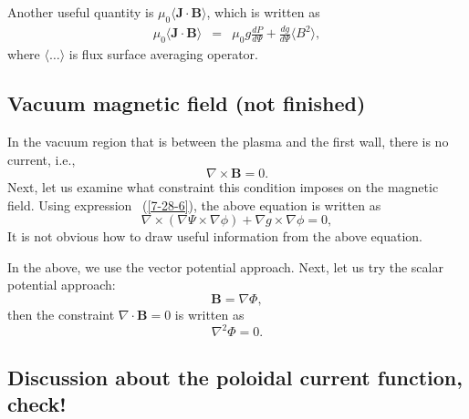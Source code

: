 \documentclass{llncs}
\begin{document}
Another useful quantity is $\mu_0 \langle \mathbf{J} \cdot \mathbf{B}
\rangle$, which is written as
\begin{eqnarray}
  \mu_0 \langle \mathbf{J} \cdot \mathbf{B} \rangle & = & \mu_0 g \frac{d P}{d
  \Psi} + \frac{d g}{d \Psi} \langle B^2 \rangle, 
\end{eqnarray}
where $\langle \ldots \rangle$ is flux surface averaging operator.

\subsection{Vacuum magnetic field (not finished)}

In the vacuum region that is between the plasma and the first wall, there is
no current, i.e.,
\begin{equation}
  \nabla \times \mathbf{B}= 0.
\end{equation}
Next, let us examine what constraint this condition imposes on the magnetic
field. Using expression \ (\ref{7-28-6}), the above equation is written as
\begin{equation}
  \nabla \times (\nabla \Psi \times \nabla \phi) + \nabla g \times \nabla \phi
  = 0,
\end{equation}
It is not obvious how to draw useful information from the above equation.

In the above, we use the vector potential approach. Next, let us try the
scalar potential approach:
\begin{equation}
  \mathbf{B}= \nabla \Phi,
\end{equation}
then the constraint $\nabla \cdot \mathbf{B}= 0$ is written as
\begin{equation}
  \nabla^2 \Phi = 0.
\end{equation}

\subsection{Discussion about the poloidal current function,
check!}\label{11-2-p4}
\end{document}
